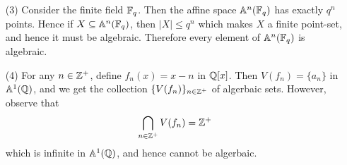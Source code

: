 \begin{example}
\begin{enumerate}
    \item[(3)] Consider the finite field $\mathbb{F}_q$. Then the affine space
       $\mathbb{A}^n(\mathbb{F}_q)$ has exactly $q^n$ points. Hence if $X \subseteq
       \mathbb{A}^n(\mathbb{F}_q)$, then $|X| \leq q^n$ which makes $X$ a finite
       point-set, and hence it must be algebraic. Therefore every
       element of $\mathbb{A}^n(\mathbb{F}_q)$ is algebraic.

     \item[(4)] For any $n \in \mathbb{Z}^+$, define $f_n(x)=x-n$ in $\mathbb{Q}[x]$.
       Then $V(f_n)=\{a_n\}$ in $\mathbb{A}^1(\mathbb{Q})$, and we get the collection
       $\{V(f_n)\}_{n \in \mathbb{Z}^+}$ of algerbaic sets. However, observe
       that
       \begin{equation*}
         \bigcap_{n \in \mathbb{Z}^+}{V(f_n)}=\mathbb{Z}^+
       \end{equation*}
       which is infinite in $\mathbb{A}^1(\mathbb{Q})$, and hence cannot be algerbaic.
  \end{enumerate}
\end{example}

